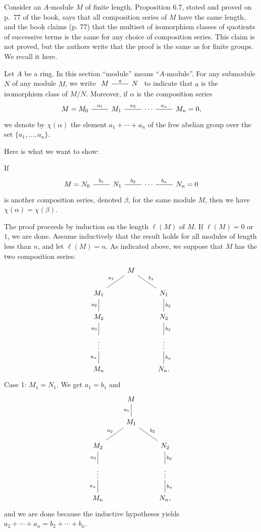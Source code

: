 \documentclass[parskip=half,fontsize=12pt]{scrartcl}%
\begin{document}
Consider an $A$-module $M$ of finite length. Proposition 6.7, stated and proved on p.~77 of the book, says that all composition series of $M$ have the same length, and the book claims (p. 77) that the multiset of isomorphism classes of quotients of successive terms is the same for any choice of composition series. This claim is not proved, but the authors write that the proof is the same as for finite groups. We recall it here. 

Let $A$ be a ring. In this section ``module'' means ``$A$-module''. For any submodule $N$ of any module $M$, we write $\begin{tikzcd}M\ar[r,dash,"a"]&N\end{tikzcd}$ to indicate that $a$ is the isomorphism class of $M/N$. Moreover, if $\alpha$ is the composition series 
$$%
\begin{tikzcd}
M=M_0\ar[r,dash,"a_1"]&M_1\ar[r,dash,"a_2"]&\cdots\ar[r,dash,"a_n"]&M_n=0,
\end{tikzcd}
$$%
we denote by $\chi(\alpha)$ the element $a_1+\cdots+a_n$ of the free abelian group over the set $\{a_1,\dots,a_n\}$. 

Here is what we want to show: 

If 
$$%
\begin{tikzcd}
M=N_0\ar[r,dash,"b_1"]&N_1\ar[r,dash,"b_2"]&\cdots\ar[r,dash,"b_n"]&N_n=0
\end{tikzcd}
$$%
is another composition series, denoted $\beta$, for the same module $M$, then we have $\chi(\alpha)=\chi(\beta)$. 

The proof proceeds by induction on the length $\ell(M)$ of $M$. If $\ell(M)=0$ or $1$, we are done. Assume inductively that the result holds for all modules of length less than $n$, and let $\ell(M)=n$. As indicated above, we suppose that $M$ has the two composition series: %
$$
\begin{tikzcd}
&M\ar[dl,dash,"a_1"']\ar[dr,dash,"b_1"]\\ 
M_1\ar[d,dash,"a_2"']&&N_1\ar[d,dash,"b_2"]\\ 
M_2\ar[d,dash,"a_3"']&&N_2\ar[d,dash,"b_3"]\\ 
\vdots\ar[d,dash,"a_n"']&&\vdots\ar[d,dash,"b_n"]\\ 
M_n&&N_n.
\end{tikzcd}
$$ 
Case 1: $M_1=N_1$. We get $a_1=b_1$ and 
$$
\begin{tikzcd}
&M\ar[d,dash,"a_1"']\\ 
&M_1\ar[dl,dash,"a_2"']\ar[dr,dash,"b_2"]\\ 
M_2\ar[d,dash,"a_3"']&&N_2\ar[d,dash,"b_3"]\\ 
\vdots\ar[d,dash,"a_n"']&&\vdots\ar[d,dash,"b_n"]\\ 
M_n&&N_n,
\end{tikzcd}
$$ 
and we are done because the inductive hypotheses yields $a_2+\cdots+a_n=b_2+\cdots+b_n$.
\end{document}
